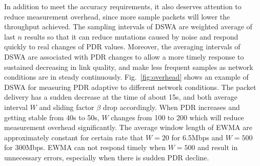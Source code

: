 \begin{figure}[!htp]
\centering
    \hspace{1cm}
\end{figure}

In addition to meet the accuracy requirements, it also deserves attention to reduce measurement overhead, since more sample packets will lower the throughput achieved. The sampling intervals of DSWA are weighted average of last $n$ results so that it can reduce mutations caused by noise and respond quickly to real changes of PDR values. Moreover, the averaging intervals of DSWA are associated with PDR changes to allow a more timely response to sustained decreasing in link quality, and make less frequent samples as network conditions are in steady continuously. Fig.~\ref{fig:overhead} shows an example of DSWA for measuring PDR adaptive to different network conditions. The packet delivery has a sudden decrease at the time of about 15s, and both average interval $W$ and sliding factor $\beta$ drop accordingly. When PDR increases and getting stable from 40s to 50s, $W$ changes from 100 to 200 which will reduce measurement overhead significantly. The average window length of EWMA are approximately constant for certain rate that $W=20$ for 6.5Mbps and $W=500$ for 300Mbps. EWMA can not respond timely when $W=500$ and result in unnecessary errors, especially when there is sudden PDR decline.

\begin{figure}[!htp]
\centering
  \hspace{1in}
\centering
  \hspace{1in}
\centering
\end{figure}

\begin{figure}[!htp]
\centering
  \hspace{1in}
\centering
  \hspace{1in}
\centering
\end{figure}

